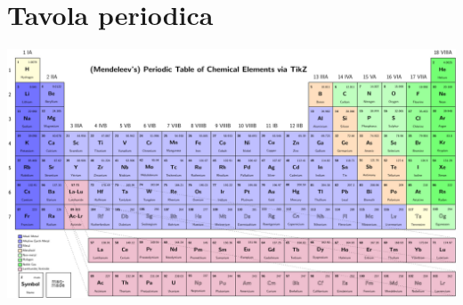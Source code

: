 \chapter{Tavola periodica}\label{chp:Tavolaperiodica}
\newpage
\includegraphics[scale = 1, angle = 90]{gfx/Periodic_table2017}
